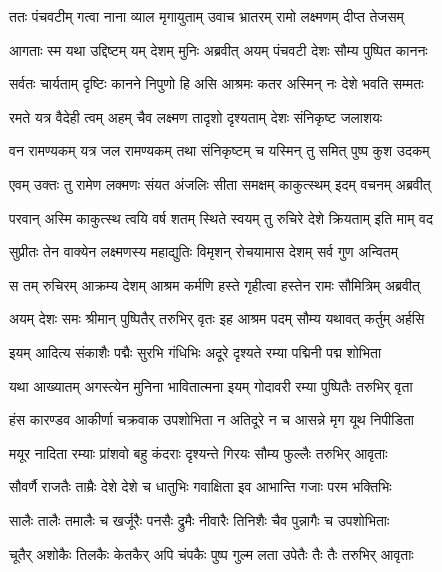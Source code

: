 
\twolineshloka
{ततः पंचवटीम् गत्वा नाना व्याल मृगायुताम्}
{उवाच भ्रातरम् रामो लक्ष्मणम् दीप्त तेजसम्} %

\twolineshloka
{आगताः स्म यथा उद्दिष्टम् यम् देशम् मुनिः अब्रवीत्}
{अयम् पंचवटी देशः सौम्य पुष्पित काननः} %

\twolineshloka
{सर्वतः चार्यताम् दृष्टिः कानने निपुणो हि असि}
{आश्रमः कतर अस्मिन् नः देशे भवति सम्मतः} %

\twolineshloka
{रमते यत्र वैदेही त्वम् अहम् चैव लक्ष्मण}
{तादृशो दृश्यताम् देशः संनिकृष्ट जलाशयः} %

\twolineshloka
{वन रामण्यकम् यत्र जल रामण्यकम् तथा}
{संनिकृष्टम् च यस्मिन् तु समित् पुष्प कुश उदकम्} %

\twolineshloka
{एवम् उक्तः तु रामेण लक्मणः संयत अंजलिः}
{सीता समक्षम् काकुत्स्थम् इदम् वचनम् अब्रवीत्} %

\twolineshloka
{परवान् अस्मि काकुत्स्थ त्वयि वर्ष शतम् स्थिते}
{स्वयम् तु रुचिरे देशे क्रियताम् इति माम् वद} %

\twolineshloka
{सुप्रीतः तेन वाक्येन लक्ष्मणस्य महाद्युतिः}
{विमृशन् रोचयामास देशम् सर्व गुण अन्वितम्} %

\twolineshloka
{स तम् रुचिरम् आक्रम्य देशम् आश्रम कर्मणि}
{हस्ते गृहीत्वा हस्तेन रामः सौमित्रिम् अब्रवीत्} %

\twolineshloka
{अयम् देशः समः श्रीमान् पुष्पितैर् तरुभिर् वृतः}
{इह आश्रम पदम् सौम्य यथावत् कर्तुम् अर्हसि} %

\twolineshloka
{इयम् आदित्य संकाशैः पद्मैः सुरभि गंधिभिः}
{अदूरे दृश्यते रम्या पद्मिनी पद्म शोभिता} %

\twolineshloka
{यथा आख्यातम् अगस्त्येन मुनिना भावितात्मना}
{इयम् गोदावरी रम्या पुष्पितैः तरुभिर् वृता} %

\twolineshloka
{हंस कारण्डव आकीर्णा चक्रवाक उपशोभिता}
{न अतिदूरे न च आसन्ने मृग यूथ निपीडिता} %

\twolineshloka
{मयूर नादिता रम्याः प्रांशवो बहु कंदराः}
{दृश्यन्ते गिरयः सौम्य फुल्लैः तरुभिर् आवृताः} %

\twolineshloka
{सौवर्णै राजतैः ताम्रैः देशे देशे च धातुभिः}
{गवाक्षिता इव आभान्ति गजाः परम भक्तिभिः} %

\twolineshloka
{सालैः तालैः तमालैः च खर्जूरैः पनसैः द्रुमैः}
{नीवारैः तिनिशैः चैव पुन्नागैः च उपशोभिताः} %

\twolineshloka
{चूतैर् अशोकैः तिलकैः केतकैर् अपि चंपकैः}
{पुष्प गुल्म लता उपेतैः तैः तैः तरुभिर् आवृताः} %

